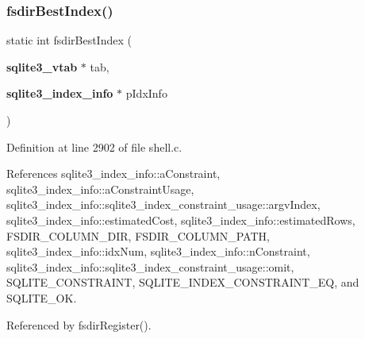 \subsubsection{fsdir\+Best\+Index()}
{\footnotesize\ttfamily static int fsdir\+Best\+Index (\begin{DoxyParamCaption}\item[{\textbf{ sqlite3\+\_\+vtab} $\ast$}]{tab,  }\item[{\textbf{ sqlite3\+\_\+index\+\_\+info} $\ast$}]{p\+Idx\+Info }\end{DoxyParamCaption})\hspace{0.3cm}{\ttfamily [static]}}



Definition at line 2902 of file shell.\+c.



References sqlite3\+\_\+index\+\_\+info\+::a\+Constraint, sqlite3\+\_\+index\+\_\+info\+::a\+Constraint\+Usage, sqlite3\+\_\+index\+\_\+info\+::sqlite3\+\_\+index\+\_\+constraint\+\_\+usage\+::argv\+Index, sqlite3\+\_\+index\+\_\+info\+::estimated\+Cost, sqlite3\+\_\+index\+\_\+info\+::estimated\+Rows, F\+S\+D\+I\+R\+\_\+\+C\+O\+L\+U\+M\+N\+\_\+\+D\+IR, F\+S\+D\+I\+R\+\_\+\+C\+O\+L\+U\+M\+N\+\_\+\+P\+A\+TH, sqlite3\+\_\+index\+\_\+info\+::idx\+Num, sqlite3\+\_\+index\+\_\+info\+::n\+Constraint, sqlite3\+\_\+index\+\_\+info\+::sqlite3\+\_\+index\+\_\+constraint\+\_\+usage\+::omit, S\+Q\+L\+I\+T\+E\+\_\+\+C\+O\+N\+S\+T\+R\+A\+I\+NT, S\+Q\+L\+I\+T\+E\+\_\+\+I\+N\+D\+E\+X\+\_\+\+C\+O\+N\+S\+T\+R\+A\+I\+N\+T\+\_\+\+EQ, and S\+Q\+L\+I\+T\+E\+\_\+\+OK.



Referenced by fsdir\+Register().


